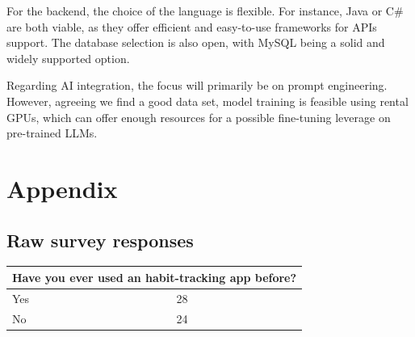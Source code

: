 \documentclass{article}
\begin{document}
For the backend, the choice of the language is flexible. For instance, Java or C\# are both viable, as they offer efficient and easy-to-use frameworks for APIs support.
The database selection is also open, with MySQL being a solid and widely supported option.

Regarding AI integration, the focus will primarily be on prompt engineering.
However, agreeing we find a good data set, model training is feasible using rental GPUs, which can offer enough resources for a possible fine-tuning leverage on pre-trained LLMs.

\newpage
\section{Appendix}

\subsection{Raw survey responses}
\label{subsec:survey-responses}

\begin{table}[H]
	\centering
	\begin{tabularx}{0.9\textwidth}{X|p{1in}}
		\hline
		\multicolumn{2}{l}{\textbf{Have you ever used an habit-tracking app before?}} \\
		\hline
		Yes & 28                                                                      \\
		\hline
		No  & 24                                                                      \\
		\hline
	\end{tabularx}
\end{table}
\end{document}
